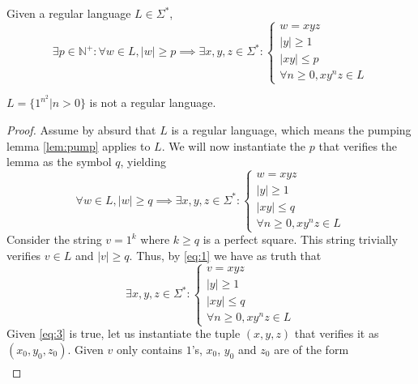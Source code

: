 \documentclass[docid=PA06]{tcom_PA}
\begin{document}
\setcounter{chapter}{5}
{
\renewcommand{\thesubsubsection}{\thesubsection\alph{subsubsection}}
\begin{lemma} \label{lem:pump}
Given a regular language $L \in \Sigma^*$,
\begin{equation*}
	\exists p \in \mathbb{N}^+ \colon \forall w \in L, |w|\geq p \implies
	\exists x,y,z \in \Sigma^* \colon
	\begin{cases}
		w=xyz\\
		|y|\geq 1\\
		|xy|\leq p\\
		\forall n \geq 0, x y^n z \in L
	\end{cases}
\end{equation*}
\end{lemma}
\begin{theorem}
	$L=\{1^{n^2} | n>0\}$ is not a regular language.
\end{theorem}
\begin{proof}
Assume by absurd that $L$ is a regular language, which means the pumping lemma \eqref{lem:pump} applies to $L$. We will now instantiate the $p$ that verifies the lemma as the symbol $q$, yielding
	\begin{equation} \label{eq:1}
	\forall w \in L, |w|\geq q \implies
	\exists x,y,z \in \Sigma^* \colon
	\begin{cases}
		w=xyz\\
		|y|\geq 1\\
		|xy|\leq q\\
		\forall n \geq 0, x y^n z \in L
	\end{cases}
\end{equation}
Consider the string $v=1^k$ where $k\geq q$ is a perfect square. This string trivially verifies $v \in L$ and $|v|\geq q$. Thus, by \eqref{eq:1} we have as truth that
\begin{equation}\label{eq:3}
	\exists x,y,z \in \Sigma^* \colon
	\begin{cases}
		v=xyz\\
		|y|\geq 1\\
		|xy|\leq q\\
		\forall n \geq 0, x y^n z \in L
	\end{cases}
\end{equation}
Given \eqref{eq:3} is true, let us instantiate the tuple $(x,y,z)$ that verifies it as $(x_0,y_0,z_0)$. Given $v$ only contains $1$'s, $x_0$, $y_0$ and $z_0$ are of the form
\begin{gather*}

\end{gather*}
\end{proof}}
\end{document}
